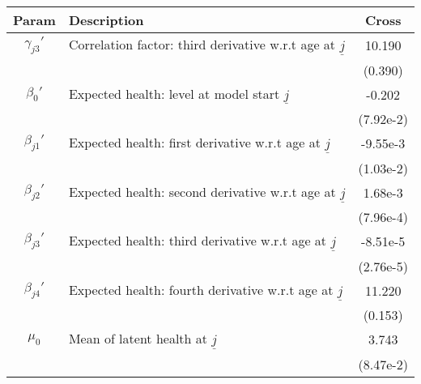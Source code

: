 \begin{table}[ht]\label{CrossMenHealthParams}
\footnotesize
\begin{center}
\begin{tabular}{clc}
\hline \hline
Param & Description & Cross \\
\hline
$\gamma_{j3}'$ & Correlation factor: third derivative w.r.t age at $\underline{j}$ & 10.190 \\
 & & (0.390) \\
$\beta_{0}'$ & Expected health: level at model start $\underline{j}$ & -0.202 \\
 & & (7.92e-2) \\
$\beta_{j1}'$ & Expected health: first derivative w.r.t age at $\underline{j}$ & -9.55e-3 \\
 & & (1.03e-2) \\
$\beta_{j2}'$ & Expected health: second derivative w.r.t age at $\underline{j}$ & 1.68e-3 \\
 & & (7.96e-4) \\
$\beta_{j3}'$ & Expected health: third derivative w.r.t age at $\underline{j}$ & -8.51e-5 \\
 & & (2.76e-5) \\
$\beta_{j4}'$ & Expected health: fourth derivative w.r.t age at $\underline{j}$ & 11.220 \\
 & & (0.153) \\
$\mu_0$ & Mean of latent health at $\underline{j}$ & 3.743 \\
 & & (8.47e-2) \\
\hline\hline
\end{tabular}
\end{center}
\end{table}
